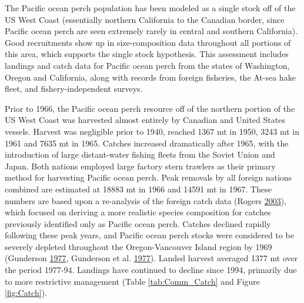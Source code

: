 \documentclass[12pt,]{article}
\begin{document}
The Pacific ocean perch population has been modeled as a single stock
off of the US West Coast (essentially northern California to the
Canadian border, since Pacific ocean perch are seen extremely rarely in
central and southern California). Good recruitments show up in
size-composition data throughout all portions of this area, which
supports the single stock hypothesis. This assessment includes landings
and catch data for Pacific ocean perch from the states of Washington,
Oregon and California, along with records from foreign fisheries, the
At-sea hake fleet, and fishery-independent surveys.

Prior to 1966, the Pacific ocean perch resource off of the northern
portion of the US West Coast was harvested almost entirely by Canadian
and United States vessels. Harvest was negligible prior to 1940, reached
1367 mt in 1950, 3243 mt in 1961 and 7635 mt in 1965. Catches increased
dramatically after 1965, with the introduction of large distant-water
fishing fleets from the Soviet Union and Japan. Both nations employed
large factory stern trawlers as their primary method for harvesting
Pacific ocean perch. Peak removals by all foreign nations combined are
estimated at 18883 mt in 1966 and 14591 mt in 1967. These numbers are
based upon a re-analysis of the foreign catch data (Rogers
\protect\hyperlink{ref-rogers_species_2003}{2003}), which focused on
deriving a more realistic species composition for catches previously
identified only as Pacific ocean perch. Catches declined rapidly
following these peak years, and Pacific ocean perch stocks were
considered to be severely depleted throughout the Oregon-Vancouver
Island region by 1969 (Gunderson
\protect\hyperlink{ref-gunderson_population_1977}{1977}, Gunderson et
al. \protect\hyperlink{ref-gunderson_status_1977}{1977}). Landed harvest
averaged 1377 mt over the period 1977-94. Landings have continued to
decline since 1994, primarily due to more restrictive management (Table
\ref{tab:Comm_Catch} and Figure \ref{fig:Catch}).
\end{document}
